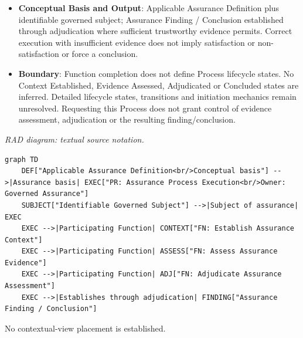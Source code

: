 \begin{itemize}
\item
\textbf{Conceptual Basis and Output}: Applicable Assurance Definition plus identifiable governed subject; Assurance Finding /\allowbreak{} Conclusion established through adjudication where sufficient trustworthy evidence permits. Correct execution with insufficient evidence does not imply satisfaction or non-satisfaction or force a conclusion.



\item
\textbf{Boundary}: Function completion does not define Process lifecycle states. No Context Established, Evidence Assessed, Adjudicated or Concluded states are inferred. Detailed lifecycle states, transitions and initiation mechanics remain unresolved. Requesting this Process does not grant control of evidence assessment, adjudication or the resulting finding/\allowbreak{}conclusion.



\end{itemize}

\textit{RAD diagram: textual source notation.}
\begin{Verbatim}[breaklines,fontsize=\footnotesize]
graph TD
    DEF["Applicable Assurance Definition<br/>Conceptual basis"] -->|Assurance basis| EXEC["PR: Assurance Process Execution<br/>Owner: Governed Assurance"]
    SUBJECT["Identifiable Governed Subject"] -->|Subject of assurance| EXEC
    EXEC -->|Participating Function| CONTEXT["FN: Establish Assurance Context"]
    EXEC -->|Participating Function| ASSESS["FN: Assess Assurance Evidence"]
    EXEC -->|Participating Function| ADJ["FN: Adjudicate Assurance Assessment"]
    EXEC -->|Establishes through adjudication| FINDING["Assurance Finding / Conclusion"]
\end{Verbatim}





No contextual-view placement is established.



